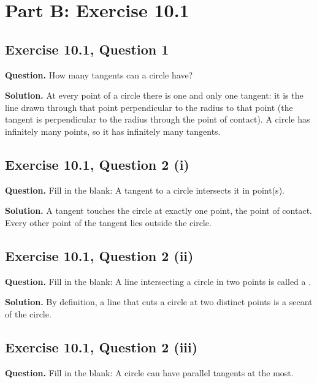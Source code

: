 \newpage
\section*{Part B: Exercise 10.1}

\subsection*{Exercise 10.1, Question 1}
\textbf{Question.} How many tangents can a circle have?

\textbf{Solution.} At every point of a circle there is one and only one tangent: it is the line drawn through that point perpendicular to the radius to that point (the tangent is perpendicular to the radius through the point of contact). A circle has infinitely many points, so it has infinitely many tangents.


\subsection*{Exercise 10.1, Question 2 (i)}
\textbf{Question.} Fill in the blank: A tangent to a circle intersects it in \underline{\hspace{2cm}} point(s).

\textbf{Solution.} A tangent touches the circle at exactly one point, the point of contact. Every other point of the tangent lies outside the circle.


\subsection*{Exercise 10.1, Question 2 (ii)}
\textbf{Question.} Fill in the blank: A line intersecting a circle in two points is called a \underline{\hspace{2cm}}.

\textbf{Solution.} By definition, a line that cuts a circle at two distinct points is a secant of the circle.


\subsection*{Exercise 10.1, Question 2 (iii)}
\textbf{Question.} Fill in the blank: A circle can have \underline{\hspace{2cm}} parallel tangents at the most.

